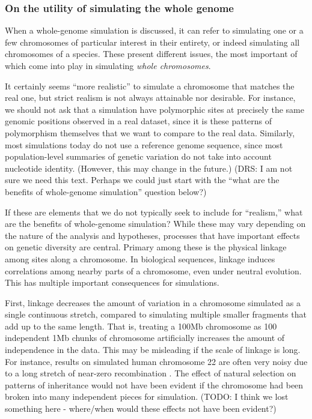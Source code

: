 \documentclass[hidelinks]{article}
\begin{document}
\hypertarget{on-the-utility-of-simulating-the-whole-genome}{%
\subsubsection*{On the utility of simulating the whole
genome}\label{on-the-utility-of-simulating-the-whole-genome}}

When a whole-genome simulation is discussed, it can refer to simulating
one or a few chromosomes of particular interest in their entirety, or
indeed simulating all chromosomes of a species. These present different
issues, the most important of which come into play in simulating
\emph{whole chromosomes}.

It certainly seems ``more realistic'' to simulate a chromosome that
matches the real one, but strict realism is not always attainable nor
desirable. For instance, we should not ask that a simulation have
polymorphic sites at precisely the same genomic positions observed in a
real dataset, since it is these patterns of polymorphism themselves that
we want to compare to the real data. Similarly, most simulations today
do not use a reference genome sequence, since most population-level
summaries of genetic variation do not take into account nucleotide
identity. (However, this may change in the future.) (DRS: I am not sure
we need this text. Perhaps we could just start with the ``what are the
benefits of whole-genome simulation'' question below?)

If these are elements that we do not typically seek to include for
``realism,'' what are the benefits of whole-genome simulation? While
these may vary depending on the nature of the analysis and hypotheses,
processes that have important effects on genetic diversity are central.
Primary among these is the physical linkage among sites along a chromosome. 
In biological sequences, linkage induces correlations
among nearby parts of a chromosome, even under neutral evolution. This
has multiple important consequences for simulations.

First, linkage decreases the amount of variation in a chromosome
simulated as a single continuous stretch, compared to simulating
multiple smaller fragments that add up to the same length. That is,
treating a 100Mb chromosome as 100 independent 1Mb chunks of chromosome
artificially increases the amount of independence in the data. This may
be misleading if the scale of linkage is long. For instance, results on
simulated human chromosome 22 are often very noisy due to a long stretch
of near-zero recombination \citep{Dawson2002}. The effect of natural selection
on patterns of inheritance would not have been evident if the chromosome
had been broken into many independent pieces for simulation. (TODO: I
think we lost something here - where/when would these effects not have
been evident?)
\end{document}
